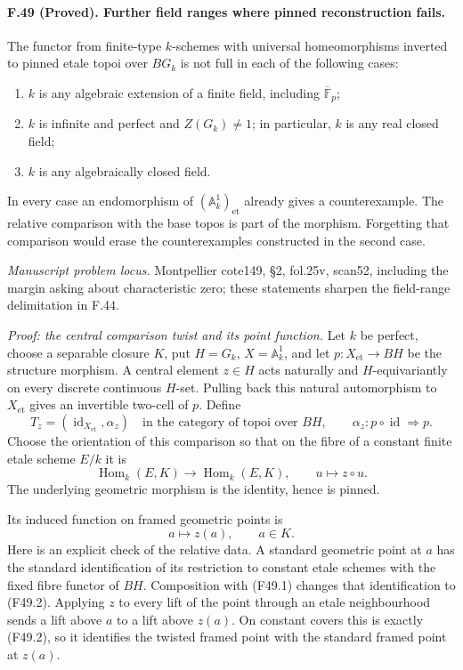\paragraph{F.49 (Proved). Further field ranges where pinned reconstruction fails.}
The functor from finite-type $k$-schemes with universal homeomorphisms
inverted to pinned etale topoi over $B G_k$ is not full in each of
the following cases:
\begin{enumerate}
\item $k$ is any algebraic extension of a finite field, including
      $\overline{\mathbb F}_p$;
\item $k$ is infinite and perfect and $Z(G_k)\ne1$; in particular,
      $k$ is any real closed field;
\item $k$ is any algebraically closed field.
\end{enumerate}
In every case an endomorphism of $(\mathbb A^1_k)_{\mathrm{et}}$
already gives a counterexample. The relative comparison with the
base topos is part of the morphism. Forgetting that comparison would
erase the counterexamples constructed in the second case.

\emph{Manuscript problem locus.} Montpellier cote149, \S2,
fol.25v, scan52, including the margin asking about characteristic
zero; these statements sharpen the field-range delimitation in F.44.

\emph{Proof: the central comparison twist and its point function.}
Let $k$ be perfect, choose a separable closure $K$, put $H=G_k$,
$X=\mathbb A^1_k$, and let $p:X_{\mathrm{et}}\to BH$ be the
structure morphism. A central element $z\in H$ acts naturally and
$H$-equivariantly on every discrete continuous $H$-set. Pulling back
this natural automorphism to $X_{\mathrm{et}}$ gives an invertible
two-cell of $p$. Define
\[
 T_z=(\operatorname{id}_{X_{\mathrm{et}}},\alpha_z)
       \quad\text{in the category of topoi over }BH,
 \qquad \alpha_z:p\circ\operatorname{id}\Longrightarrow p.
                                                               \tag{F49.1}
\]
Choose the orientation of this comparison so that on the fibre of a
constant finite etale scheme $E/k$ it is
\[
 \operatorname{Hom}_k(E,K)\longrightarrow
 \operatorname{Hom}_k(E,K),\qquad u\longmapsto z\circ u.
                                                               \tag{F49.2}
\]
The underlying geometric morphism is the identity, hence is pinned.

Its induced function on framed geometric points is
\[
                         a\longmapsto z(a),\qquad a\in K.
                                                               \tag{F49.3}
\]
Here is an explicit check of the relative data. A standard geometric
point at $a$ has the standard identification of its restriction to
constant etale schemes with the fixed fibre functor of $BH$.
Composition with (F49.1) changes that identification to (F49.2).
Applying $z$ to every lift of the point through an etale neighbourhood
sends a lift above $a$ to a lift above $z(a)$. On constant covers
this is exactly (F49.2), so it identifies the twisted framed point
with the standard framed point at $z(a)$.

